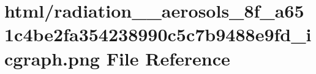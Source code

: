 \hypertarget{radiation____aerosols__8f__a651c4be2fa354238990c5c7b9488e9fd__icgraph_8png}{}\section{html/radiation\+\_\+\+\_\+aerosols\+\_\+8f\+\_\+a651c4be2fa354238990c5c7b9488e9fd\+\_\+icgraph.png File Reference}
\label{radiation____aerosols__8f__a651c4be2fa354238990c5c7b9488e9fd__icgraph_8png}
